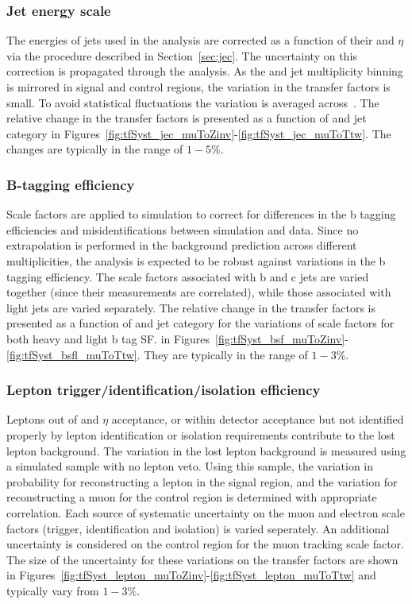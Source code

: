 \subsubsection{Jet energy scale}
\label{sec:tfSyst_jec}
The energies of jets used in the analysis are corrected as a function of their \pt and
$\eta$ via the procedure described in Section~\ref{sec:jec}. The uncertainty on
this correction is propagated through the analysis. As the \scalht and jet multiplicity binning is 
mirrored in signal and control regions, the variation in the transfer factors is small.
To avoid statistical fluctuations the variation is averaged across~\nb. The relative change 
in the transfer factors is presented as a function of \scalht and jet category 
in Figures~\ref{fig:tfSyst_jec_muToZinv}-\ref{fig:tfSyst_jec_muToTtw}.
The changes are typically in the range of $1-5\%$.

\subsubsection{B-tagging efficiency}

Scale factors are applied to simulation to correct for differences in the 
b tagging efficiencies and misidentifications between simulation and data. 
Since no extrapolation is performed in the background prediction across different 
\nb multiplicities, the analysis is expected to be robust against variations in the 
b tagging efficiency. The scale factors associated with b and c jets are varied together 
(since their measurements are correlated), while those associated with light jets are varied separately.
The relative change in the transfer factors is presented as a function of \scalht and jet category 
for the variations of scale factors for both heavy and light b tag SF.
in Figures~\ref{fig:tfSyst_bsf_muToZinv}-\ref{fig:tfSyst_bsfl_muToTtw}.
They are typically in the range of $1-3\%$.

\subsubsection{Lepton trigger/identification/isolation efficiency}
\label{sec:tfSyst_lepton}

Leptons out of \pt and $\eta$ acceptance, or within detector
acceptance but not identified properly by lepton identification or isolation
requirements contribute to the lost lepton background. The variation 
in the lost lepton background is measured using a simulated sample with no lepton veto.
Using this sample, the variation in probability for reconstructing a lepton in the signal region,
and the variation for reconstructing a muon for the \mj control region is determined with 
appropriate correlation. Each source of systematic uncertainty 
on the muon and electron scale factors (trigger, identification and isolation) is varied seperately. 
An additional uncertainty is considered on the \mj control region for the muon tracking
scale factor. The size of the uncertainty for these variations on the transfer factors are
shown in Figures~\ref{fig:tfSyst_lepton_muToZinv}-\ref{fig:tfSyst_lepton_muToTtw}
and typically vary from $1-3\%$.

